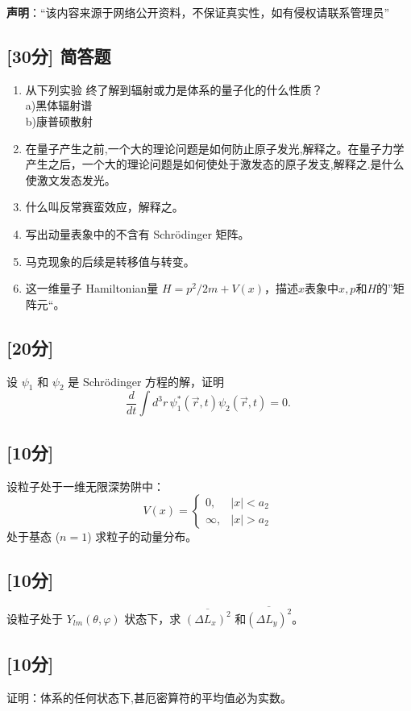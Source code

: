 
\textbf{声明}：“该内容来源于网络公开资料，不保证真实性，如有侵权请联系管理员”

\subsection{[30分] 简答题}
 \begin{enumerate}
        \item 从下列实验 终了解到辐射或力是体系的量子化的什么性质？\\
        a)黑体辐射谱\\b)康普硕散射
        \item 在量子产生之前,一个大的理论问题是如何防止原子发光,解释之。在量子力学产生之后，一个大的理论问题是如何使处于激发态的原子发支,解释之.是什么使激文发态发光。
        \item 什么叫反常赛蛮效应，解释之。
        \item 写出动量表象中的不含有 Schrödinger 矩阵。
        \item 马克现象的后续是转移值与转变。
        \item 这一维量子 Hamiltonian量 $H = p^2/2m + V(x)$，描述$x$表象中$x,p \text{和} H$的”矩阵元“。
    \end{enumerate}

\subsection{[20分]}
设 $\psi_1$ 和 $\psi_2$ 是 Schrödinger 方程的解，证明
\[
\frac{d}{dt} \int d^3r \, \psi_1^* (\vec{r}, t) \psi_2 (\vec{r}, t) = 0.~
\]

\subsection{[10分]}
设粒子处于一维无限深势阱中：
\[
V(x) =
\begin{cases}
0, & |x| < a_2 \\
\infty, & |x| > a_2
\end{cases}~
\]
处于基态 ($n=1$) 求粒子的动量分布。

\subsection{[10分]}
设粒子处于 $Y_{lm}(\theta, \varphi)$ 状态下，求 $\overline{(\Delta L_x)^2}$ 和$\overline{(\Delta L_y)^2}$。

\subsection{[10分]}
证明：体系的任何状态下,甚厄密算符的平均值必为实数。

